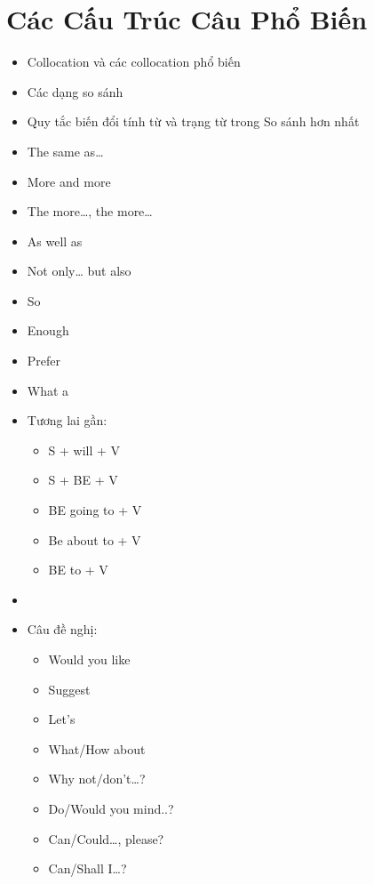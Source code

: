 \chapter{Các Cấu Trúc Câu Phổ Biến}
\begin{multicols*}{2}
    \begin{itemize}
        \item Collocation và các collocation phổ biến
        \item Các dạng so sánh
        \item Quy tắc biến đổi tính từ và trạng từ trong So sánh hơn nhất
        \item The same as…
        \item More and more
        \item The more…, the more…
        \item As well as
        \item Not only… but also
        \item So
        \item Enough
        \item Prefer
        \item What a
        \item Tương lai gần:
        \begin{itemize}
            \item S + will + V
            \item S + BE + V
            \item BE going to + V
            \item Be about to + V
            \item BE to + V
        \end{itemize}
        \item[]
        \item Câu đề nghị:
        \begin{itemize}
            \item Would you like
            \item Suggest
            \item Let’s
            \item What/How about
            \item Why not/don’t…?
            \item Do/Would you mind..?
            \item Can/Could…, please?
            \item Can/Shall I…?
        \end{itemize}
    \end{itemize}
\end{multicols*}
